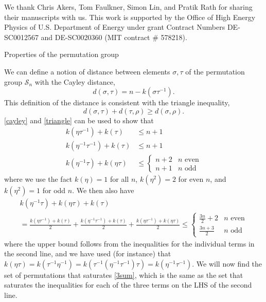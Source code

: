 \documentclass[a4paper,11pt]{article}
\newcommand{\be}{\begin{equation}}
\newcommand{\ee}{\end{equation}}
\newcommand\sS{{\mathcal S}}
\begin{document}
\begin{enumerate}
\acknowledgments

We thank Chris Akers, Tom Faulkner, Simon Lin, and Pratik Rath for sharing their manuscripts with us. This work is supported by the Office of High Energy Physics of U.S. Department of Energy under grant Contract Numbers DE-SC0012567 and DE-SC0020360 (MIT contract \# 578218).


\begin{appendix} 
\begin{section}{Properties of the permutation group}
\label{app:perm}

We can define a notion of distance between elements $\sigma, \tau$ of the permutation group $\sS_n$ with the Cayley distance, 
\be 
d(\sigma, \tau) = n - k(\sigma \tau^{-1}). \label{cayley}
\ee
This definition of the distance is consistent with the triangle inequality, 
\be 
d(\sigma, \tau) + d(\tau, \rho)\geq d(\sigma, \rho). \label{triangle}
\ee
\eqref{cayley} and \eqref{triangle} can be used to show that
\begin{align} 
k(\eta \tau^{-1})+ k(\tau)&\leq n+1 \\ k(\eta^{-1} \tau^{-1})+ k(\tau)&\leq n+1 \\ k(\eta^{-1}\tau) + k(\eta \tau) & \leq \begin{cases} n+2 & n \text{ even} \\ n+1 & n \text{ odd}
\end{cases} 
\label{twosums}
\end{align} 
where we use the fact $k(\eta)=1$ for all $n$, $k(\eta^2)=2$ for even $n$, and $k(\eta^2)=1$ for odd $n$. 
We then also have 
\be 
\begin{gathered} 
k(\eta^{-1} \tau)+ k(\eta \tau) + k(\tau) \\= \frac{k(\eta \tau^{-1}) + k(\tau)}{2}+ \frac{k(\eta^{-1} \tau^{-1}) + k(\tau)}{2} + \frac{k(\eta\tau^{-1}) +k(\eta\tau)}{2} \leq \begin{cases} \frac{3n}{2} +2 & n \text{ even}\\
\frac{3n+3}{2}& n\text{ odd}
\end{cases} \label{3sum}
\end{gathered}
\ee
where the upper bound follows from the inequalities for the individual terms in the second line, and we have used (for instance) that $k(\eta\tau) = k(\tau^{-1}\eta^{-1}) = k(\tau^{-1}(\eta^{-1} \tau^{-1})\tau) = k(\eta^{-1}\tau^{-1})$. We will now find the set of permutations that saturates \eqref{3sum}, which is the same as the set that saturates the inequalities for each of the three terms on the LHS of the second line. 


\end{section}
\end{appendix}
\end{enumerate}
\end{document}
